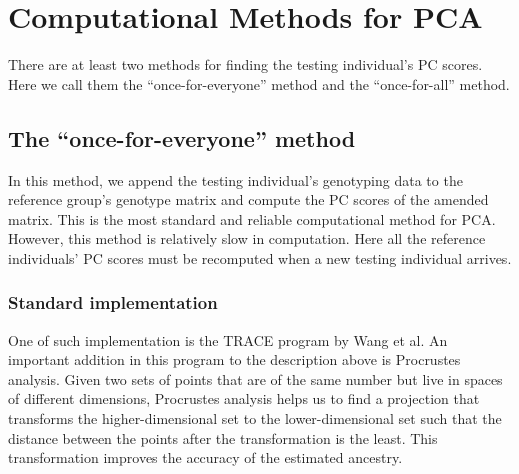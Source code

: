 \documentclass{article}[12pt]
\begin{document}
\section{Computational Methods for PCA}

There are at least two methods for finding the testing individual's PC scores.
Here we call them the ``once-for-everyone'' method and the ``once-for-all'' method.

\subsection{The ``once-for-everyone'' method}


In this method, we append the testing individual's genotyping data to the reference group's genotype matrix and compute the PC scores of the amended matrix.
This is the most standard and reliable computational method for PCA.
However, this method is relatively slow in computation.
Here all the reference individuals' PC scores must be recomputed when a new testing individual arrives.
  
\subsubsection{Standard implementation}

One of such implementation is the TRACE program by Wang et al.
An important addition in this program to the description above is Procrustes analysis.
Given two sets of points that are of the same number but live in spaces of different dimensions,
Procrustes analysis helps us to find a projection
that transforms the higher-dimensional set to the lower-dimensional set
such that the distance between the points after the transformation is the least.
This transformation improves the accuracy of the estimated ancestry.
\end{document}
